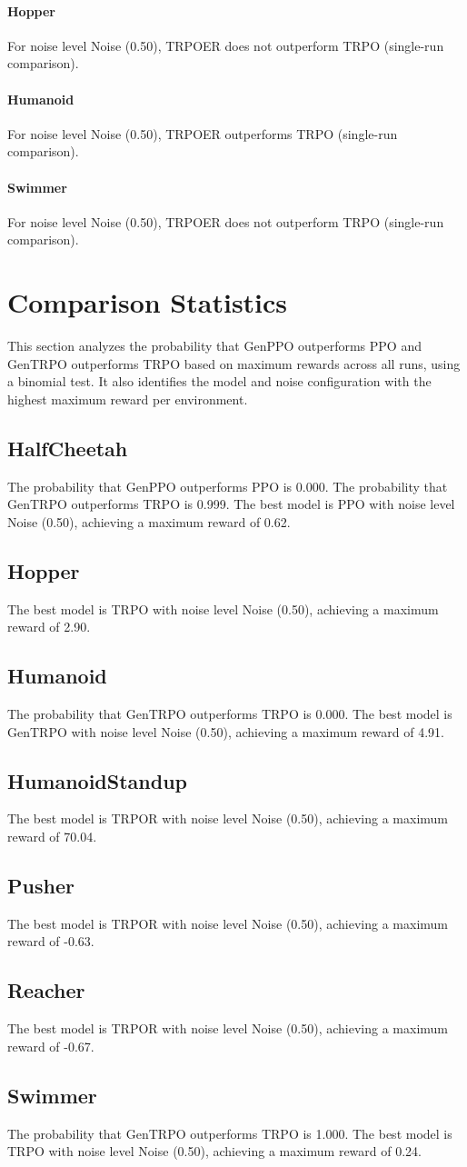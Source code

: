 \paragraph{Hopper}
For noise level Noise (0.50), TRPOER does not outperform TRPO (single-run comparison).
\paragraph{Humanoid}
For noise level Noise (0.50), TRPOER outperforms TRPO (single-run comparison).
\paragraph{Swimmer}
For noise level Noise (0.50), TRPOER does not outperform TRPO (single-run comparison).
\section{Comparison Statistics}
This section analyzes the probability that GenPPO outperforms PPO and GenTRPO outperforms TRPO based on maximum rewards across all runs, using a binomial test. It also identifies the model and noise configuration with the highest maximum reward per environment.
\subsection{HalfCheetah}
The probability that GenPPO outperforms PPO is 0.000.
The probability that GenTRPO outperforms TRPO is 0.999.
The best model is PPO with noise level Noise (0.50), achieving a maximum reward of 0.62.
\subsection{Hopper}
The best model is TRPO with noise level Noise (0.50), achieving a maximum reward of 2.90.
\subsection{Humanoid}
The probability that GenTRPO outperforms TRPO is 0.000.
The best model is GenTRPO with noise level Noise (0.50), achieving a maximum reward of 4.91.
\subsection{HumanoidStandup}
The best model is TRPOR with noise level Noise (0.50), achieving a maximum reward of 70.04.
\subsection{Pusher}
The best model is TRPOR with noise level Noise (0.50), achieving a maximum reward of -0.63.
\subsection{Reacher}
The best model is TRPOR with noise level Noise (0.50), achieving a maximum reward of -0.67.
\subsection{Swimmer}
The probability that GenTRPO outperforms TRPO is 1.000.
The best model is TRPO with noise level Noise (0.50), achieving a maximum reward of 0.24.